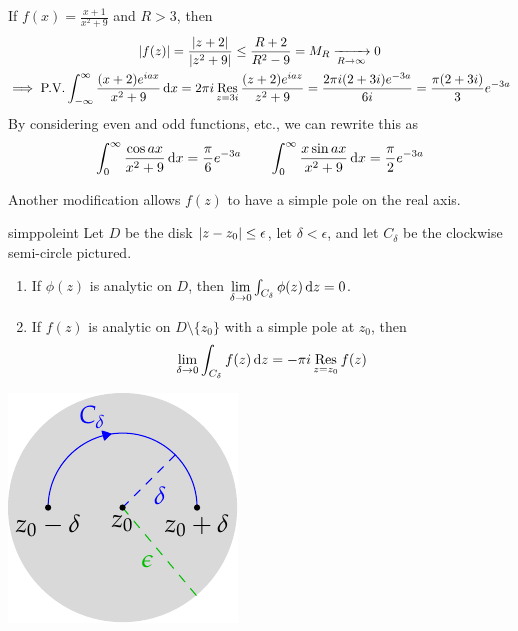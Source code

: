 \begin{example}{}{}
	If $f(x)=\frac{x+1}{x^2+9}$ and $R>3$, then
	\begin{gather*}
		\left| f(z)\right|=\frac{\left| z+2\right|}{\left| z^2+9\right|}
		\le\frac{R+2}{R^2-9}
		=M_R\xrightarrow[R\to\infty]{}0\\
		\implies \text{P.V.}\int_{-\infty}^\infty\frac{(x+2)e^{i ax}}{x^2+9}\,{\mathrm{d} x}
		=2\pi i\operatorname*{Res}_{z=3i}\frac{(z+2)e^{iaz}}{z^2+9}
		=\frac{2\pi i(2+3i)e^{-3a}}{6i} 
		=\frac{\pi(2+3i)}3e^{-3a}
	\end{gather*}
	By considering even and odd functions, etc., we can rewrite this as
	\[
		\int_0^\infty\frac{\cos ax}{x^2+9}\,{\mathrm{d} x} 
		=\frac{\pi}{6}e^{-3a}
		\qquad \int_0^\infty\frac{x\sin ax}{x^2+9}\,{\mathrm{d} x} 
		=\frac{\pi}{2}e^{-3a}
	\]
\end{example}


\goodbreak



Another modification allows $f(z)$ to have a simple pole on the real axis.

\begin{lemm}[lower separated=false, sidebyside, sidebyside align=top seam, sidebyside gap=0pt, righthand width=0.3\linewidth]{}{simppoleint}
	Let $D$ be the disk $\left| z-z_0\right|\le\epsilon$, let $\delta<\epsilon$, and let $C_\delta$ be the clockwise semi-circle pictured.
	\begin{enumerate}
	  \item If $\phi(z)$ is analytic on $D$, then $\lim\limits_{\delta\to 0}\int_{C_\delta}\phi(z)\,{\mathrm{d} z}=0$.
	  \item If $f(z)$ is analytic on $D\setminus\{z_0\}$ with a simple pole at $z_0$, then
	  \[
	  	\lim_{\delta\to 0}\int_{C_\delta}f(z)\,{\mathrm{d} z}=-\pi i\operatorname*{Res}_{z=z_0}f(z)
	  \] 
	\end{enumerate}
	\tcblower
	\flushright\includegraphics[scale=0.95]{integral5}
\end{lemm}

